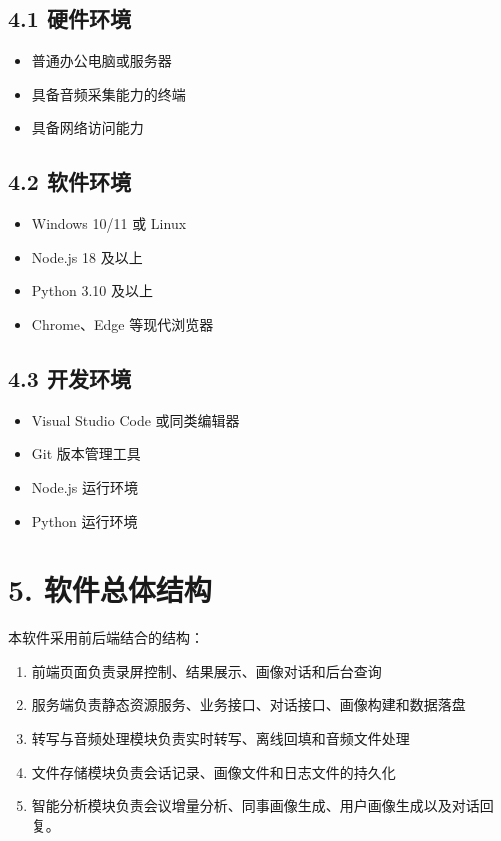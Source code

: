 \documentclass[12pt,a4paper]{article}
\begin{document}
\subsection*{4.1 硬件环境}
\vspace{0.45em}
\begin{itemize}
\item 普通办公电脑或服务器
\item 具备音频采集能力的终端
\item 具备网络访问能力
\end{itemize}
\vspace{0.45em}
\subsection*{4.2 软件环境}
\vspace{0.45em}
\begin{itemize}
\item Windows 10/11 或 Linux
\end{itemize}
\newpage
{}
\fancyhead[R]{}
\begin{itemize}
\item Node.js 18 及以上
\item Python 3.10 及以上
\item Chrome、Edge 等现代浏览器
\end{itemize}
\vspace{0.45em}
\subsection*{4.3 开发环境}
\vspace{0.45em}
\begin{itemize}
\item Visual Studio Code 或同类编辑器
\item Git 版本管理工具
\item Node.js 运行环境
\item Python 运行环境
\end{itemize}
\vspace{0.45em}
\section*{5. 软件总体结构}
\vspace{0.45em}
本软件采用前后端结合的结构：\par
\vspace{0.45em}
\begin{enumerate}
\item 前端页面负责录屏控制、结果展示、画像对话和后台查询
\item 服务端负责静态资源服务、业务接口、对话接口、画像构建和数据落盘
\item 转写与音频处理模块负责实时转写、离线回填和音频文件处理
\item 文件存储模块负责会话记录、画像文件和日志文件的持久化
\item 智能分析模块负责会议增量分析、同事画像生成、用户画像生成以及对话回复。
\end{enumerate}
\vspace{0.45em}
\end{document}
